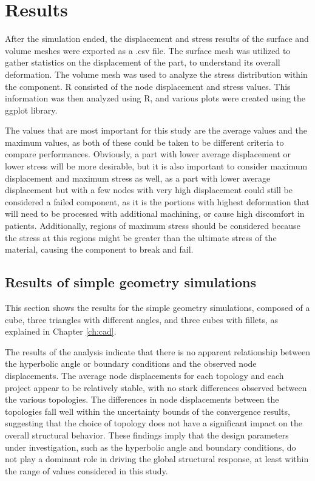 \documentclass[../main.tex]{subfiles}
\begin{document}
\chapter{Results}

After the simulation ended, the displacement and stress results of the surface and volume meshes were exported as a .csv file. The surface mesh was utilized to gather statistics on the displacement of the part, to understand its overall deformation. The volume mesh was used to analyze the stress distribution within the component. R consisted of the node displacement and stress values. This information was then analyzed using R, and various plots were created using the ggplot library. 

The values that are most important for this study are the average values and the maximum values, as both of these could be taken to be different criteria to compare performances. Obviously, a part with lower average displacement or lower stress will be more desirable, but it is also important to consider maximum displacement and maximum stress as well, as a part with lower average displacement but with a few nodes with very high displacement could still be considered a failed component, as it is the portions with highest deformation that will need to be processed with additional machining, or cause high discomfort in patients. Additionally, regions of maximum stress should be considered because the stress at this regions might be greater than the ultimate stress of the material, causing the component to break and fail.


\section{Results of simple geometry simulations}

This section shows the results for the simple geometry simulations, composed of a cube, three triangles with different angles, and three cubes with fillets, as explained in Chapter \ref{ch:cad}.


The results of the analysis indicate that there is no apparent relationship between the hyperbolic angle or boundary conditions and the observed node displacements. The average node displacements for each topology and each project appear to be relatively stable, with no stark differences observed between the various topologies. The differences in node displacements between the topologies fall well within the uncertainty bounds of the convergence results, suggesting that the choice of topology does not have a significant impact on the overall structural behavior. These findings imply that the design parameters under investigation, such as the hyperbolic angle and boundary conditions, do not play a dominant role in driving the global structural response, at least within the range of values considered in this study. 
\end{document}
